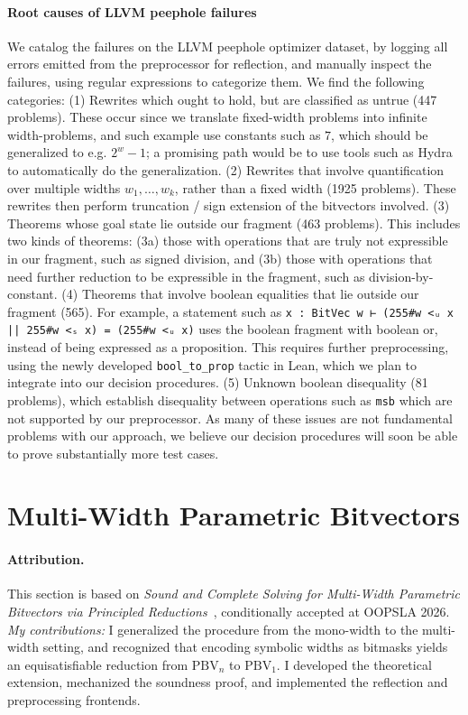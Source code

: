 \paragraph{Root causes of LLVM peephole failures}
We catalog the failures on the LLVM peephole optimizer dataset,
by logging all errors emitted from the preprocessor for reflection,
and manually inspect the failures, using regular expressions to categorize them.
We find the following categories: (1) Rewrites which ought to hold, but are classified as untrue (447 problems).
These occur since we translate fixed-width problems into infinite width-problems, and such example use constants such as $7$,
which should be generalized to e.g. $2^w - 1$; a promising path would be to use
tools such as Hydra~\citep{mukherjee2024hydra} to automatically do the
generalization.
(2) Rewrites that involve quantification over multiple widths $w_1, \dots, w_k$, rather than a fixed width (1925 problems).
These rewrites then perform truncation / sign extension of the bitvectors involved.
(3) Theorems whose goal state lie outside our fragment (463 problems). This includes two kinds of theorems:
(3a) those with operations that are truly not expressible in our fragment, such as signed division,
and (3b) those with operations that need further reduction to be expressible in the fragment, such as division-by-constant.
(4) Theorems that involve boolean equalities that lie outside our fragment (565).
For example, a statement such as \texttt{x : BitVec w ⊢ (255\#w <ᵤ x || 255\#w <ₛ x) = (255\#w <ᵤ x)} uses the
boolean fragment with boolean or, instead of being expressed as a proposition.
This requires further preprocessing, using the newly developed \texttt{bool\_to\_prop} tactic in Lean,
which we plan to integrate into our decision procedures.
(5) Unknown boolean disequality (81 problems), which establish disequality between operations such as \texttt{msb}
which are not supported by our preprocessor.
%
As many of these issues are not fundamental problems with our approach, we
believe our decision procedures will soon be able to prove substantially more
test cases.


\section{Multi-Width Parametric Bitvectors}
\label{sec:pbv:multi-width}

\paragraph*{Attribution.} This section is based on \emph{Sound and Complete
Solving for Multi-Width Parametric Bitvectors via Principled
Reductions}~\citep{bhat2026multiwidth}, conditionally accepted at OOPSLA 2026.
\emph{My contributions:} I generalized the procedure from the mono-width to the
multi-width setting, and recognized that encoding symbolic widths as bitmasks yields an
equisatisfiable reduction from $\text{PBV}_n$ to $\text{PBV}_1$. I developed the
theoretical extension, mechanized the soundness proof, and implemented the
reflection and preprocessing frontends.

